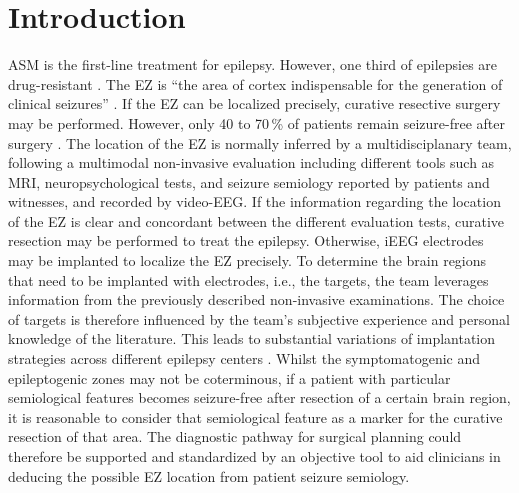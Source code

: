 \section{Introduction}

\Ac{ASM} is the first-line treatment for epilepsy.
However, one third of epilepsies are drug-resistant \cite{engel_what_2016}.
The \ac{EZ} is ``the area of cortex indispensable for the generation of clinical seizures'' \cite{rosenow_presurgical_2001}.
If the \ac{EZ} can be localized precisely, curative resective surgery may be performed.
However, only 40 to 70\,\% of patients remain seizure-free after surgery \cite{jobst_resective_2015}.
The location of the \ac{EZ} is normally inferred by a multidisciplanary team, following a multimodal non-invasive evaluation including different tools such as \ac{MRI}, neuropsychological tests, and seizure semiology reported by patients and witnesses, and recorded by video-\ac{EEG}.
If the information regarding the location of the \ac{EZ} is clear and concordant between the different evaluation tests, curative resection may be performed to treat the epilepsy.
Otherwise, \ac{iEEG} electrodes may be implanted to localize the \ac{EZ} precisely.
To determine the brain regions that need to be implanted with electrodes, i.e., the targets, the team leverages information from the previously described non-invasive examinations.
The choice of targets is therefore influenced by the team's subjective experience and personal knowledge of the literature.
This leads to substantial variations of implantation strategies across different epilepsy centers \cite{tufenkjian_seizure_2012}.
Whilst the symptomatogenic and epileptogenic zones may not be coterminous, if a patient with particular semiological features becomes seizure-free after resection of a certain brain region, it is reasonable to consider that semiological feature as a marker for the curative resection of that area.
The diagnostic pathway for surgical planning could therefore be supported and standardized by an objective tool to aid clinicians in deducing the possible \ac{EZ} location from patient seizure semiology.


